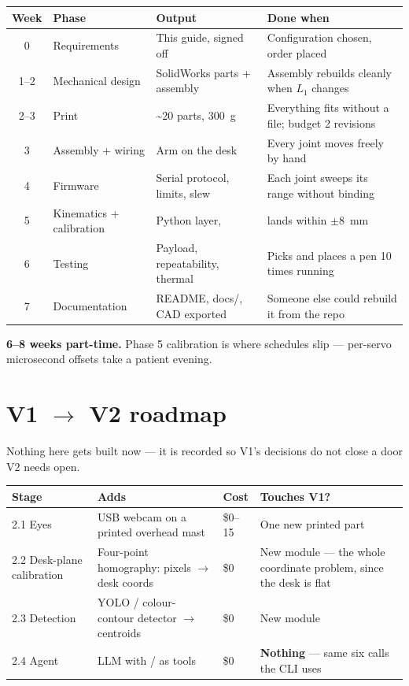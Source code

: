 \documentclass[11pt]{article}
\newcommand{\code}[1]{\texttt{\detokenize{#1}}}
\begin{document}
\begin{center}
\small
\begin{tabular}{@{}cp{2.6cm}p{3.6cm}p{6.4cm}@{}}
\toprule
\textbf{Week} & \textbf{Phase} & \textbf{Output} & \textbf{Done when} \\
\midrule
0 & Requirements & This guide, signed off & Configuration chosen, order placed \\
1--2 & Mechanical design & SolidWorks parts + assembly & Assembly rebuilds cleanly when $L_1$ changes \\
2--3 & Print & \textasciitilde20 parts, 300~g & Everything fits without a file; budget 2 revisions \\
3 & Assembly + wiring & Arm on the desk & Every joint moves freely by hand \\
4 & Firmware & Serial protocol, limits, slew & Each joint sweeps its range without binding \\
5 & Kinematics + calibration & Python layer, \code{arm.py} & \code{move\_to()} lands within $\pm$8~mm \\
6 & Testing & Payload, repeatability, thermal & Picks and places a pen 10 times running \\
7 & Documentation & README, docs/, CAD exported & Someone else could rebuild it from the repo \\
\bottomrule
\end{tabular}
\end{center}

\textbf{6--8 weeks part-time.} Phase 5 calibration is where schedules slip --- per-servo microsecond offsets take a patient evening.

\section{V1 $\to$ V2 roadmap}
\label{sec:v2}

Nothing here gets built now --- it is recorded so V1's decisions do not close a door V2 needs open.

\begin{center}
\small
\begin{tabular}{L{2.3cm}L{5.0cm}L{1.1cm}L{5.6cm}}
\toprule
\textbf{Stage} & \textbf{Adds} & \textbf{Cost} & \textbf{Touches V1?} \\
 Eyes & USB webcam on a printed overhead mast & \$0--15 & One new printed part \\
2.2 Desk-plane calibration & Four-point homography: pixels $\to$ desk coords & \$0 & New module --- the whole coordinate problem, since the desk is flat \\
2.3 Detection & YOLO / colour-contour detector $\to$ centroids & \$0 & New module \\
2.4 Agent & LLM with \code{arm.pickup()}/\code{arm.place()} as tools & \$0 & \textbf{Nothing} --- same six calls the CLI uses \\
\bottomrule
\end{tabular}
\end{center}
\end{document}
